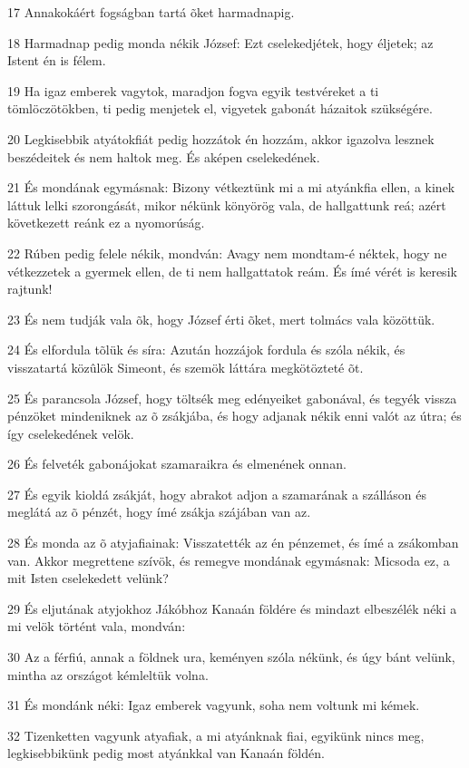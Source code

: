 \par 17 Annakokáért fogságban tartá õket harmadnapig.
\par 18 Harmadnap pedig monda nékik József: Ezt cselekedjétek, hogy éljetek; az Istent én is félem.
\par 19 Ha igaz emberek vagytok, maradjon fogva egyik testvéreket a ti tömlöczötökben, ti pedig menjetek el, vigyetek gabonát házaitok szükségére.
\par 20 Legkisebbik atyátokfiát pedig hozzátok én hozzám, akkor igazolva lesznek beszédeitek és nem haltok meg. És aképen cselekedének.
\par 21 És mondának egymásnak: Bizony vétkeztünk mi a mi atyánkfia ellen, a kinek láttuk lelki szorongását, mikor nékünk könyörög vala, de hallgattunk reá; azért következett reánk ez a nyomorúság.
\par 22 Rúben pedig felele nékik, mondván: Avagy nem mondtam-é néktek, hogy ne vétkezzetek a gyermek ellen, de ti nem hallgattatok reám. És ímé vérét is keresik rajtunk!
\par 23 És nem tudják vala õk, hogy József érti õket, mert tolmács vala közöttük.
\par 24 És elfordula tõlük és síra: Azután hozzájok fordula és szóla nékik, és visszatartá közûlök Simeont, és szemök láttára megkötözteté õt.
\par 25 És parancsola József, hogy töltsék meg edényeiket gabonával, és tegyék vissza pénzöket mindeniknek az õ zsákjába, és hogy adjanak nékik enni valót az útra; és így cselekedének velök.
\par 26 És felveték gabonájokat szamaraikra és elmenének onnan.
\par 27 És egyik kioldá zsákját, hogy abrakot adjon a szamarának a szálláson és meglátá az õ pénzét, hogy ímé zsákja szájában van az.
\par 28 És monda az õ atyjafiainak: Visszatették az én pénzemet, és ímé a zsákomban van. Akkor megrettene szívök, és remegve mondának egymásnak: Micsoda ez, a mit Isten cselekedett velünk?
\par 29 És eljutának atyjokhoz Jákóbhoz Kanaán földére és mindazt elbeszélék néki a mi velök történt vala, mondván:
\par 30 Az a férfiú, annak a földnek ura, keményen szóla nékünk, és úgy bánt velünk, mintha az országot kémleltük volna.
\par 31 És mondánk néki: Igaz emberek vagyunk, soha nem voltunk mi kémek.
\par 32 Tizenketten vagyunk atyafiak, a mi atyánknak fiai, egyikünk nincs meg, legkisebbikünk pedig most atyánkkal van Kanaán földén.
